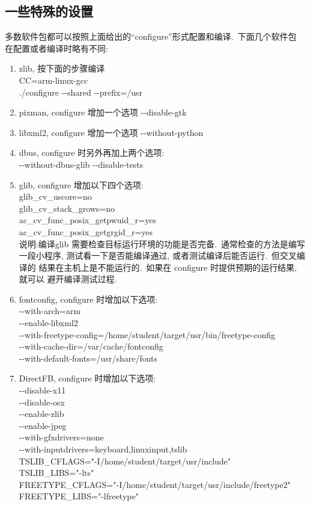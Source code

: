 \subsection{一些特殊的设置}
    多数软件包都可以按照上面给出的``configure''形式配置和编译.~下面几个软件包
在配置或者编译时略有不同:
\begin{enumerate}
  \item zlib, 按下面的步骤编译\\
      CC=arm-linux-gcc\\
      ./configure -{}-shared -{}-prefix=/usr

  \item pixman, configure 增加一个选项 -{}-disable-gtk

  \item libxml2, configure 增加一个选项 -{}-without-python

  \item dbus,  configure 时另外再加上两个选项:\\
      -{}-without-dbus-glib  -{}-disable-tests

  \item glib, configure 增加以下四个选项:\\
          glib\_cv\_uscore=no\\
          glib\_cv\_stack\_grows=no\\
          ac\_cv\_func\_posix\_getpwuid\_r=yes \\
          ac\_cv\_func\_posix\_getgrgid\_r=yes\\
    说明:编译glib 需要检查目标运行环境的功能是否完备.~通常检查的方法是编写
    一段小程序, 测试看一下是否能编译通过, 或者测试编译后能否运行.~但交叉编译的
    结果在主机上是不能运行的.~如果在 configure 时提供预期的运行结果, 就可以
    避开编译测试过程.

  \item fontconfig, configure 时增加以下选项:\\
      -{}-with-arch=arm \\
      -{}-enable-libxml2 \\
      -{}-with-freetype-config=/home/student/target/usr/bin/freetype-config \\
      -{}-with-cache-dir=/var/cache/fontconfig \\
      -{}-with-default-fonts=/usr/share/fonts

  \item DirectFB, configure 时增加以下选项:\\
      -{}-disable-x11 \\
      -{}-disable-osx \\
      -{}-enable-zlib \\
      -{}-enable-jpeg \\
      -{}-with-gfxdrivers=none \\
      -{}-with-inputdrivers=keyboard,linuxinput,tslib \\
      TSLIB\_CFLAGS="-I/home/student/target/usr/include" \\
      TSLIB\_LIBS="-lts" \\
      FREETYPE\_CFLAGS="-I/home/student/target/usr/include/freetype2" \\
      FREETYPE\_LIBS="-lfreetype"


\end{enumerate}
